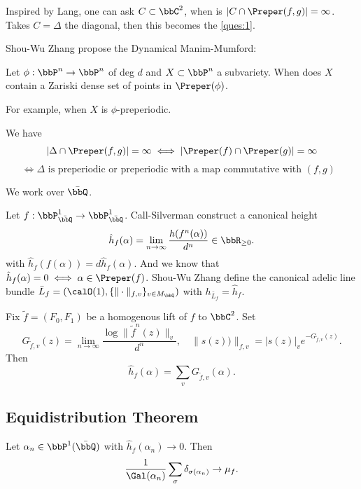 Inspired by Lang, one can ask $C \subset \bbC^2$, when is $|C \cap \Preper(f,g)| = \infty$.
Takes $C = \Delta$ the diagonal, then this becomes the \cref{ques:1}.

Shou-Wu Zhang propose the Dynamical Manim-Mumford:
\begin{conjecture}[label=\labelNFM{conj:dmm}, status=draft, tag=0000000]
	Let $\phi: \bbP^n \to \bbP^n$ of deg $d$ and $X \subset \bbP^n$ a subvariety.
	When does $X$ contain a Zariski dense set of points in $\Preper(\phi)$.
\end{conjecture}

For example, when $X$ is $\phi$-preperiodic.

\begin{theorem}[label=\labelNFM{thm:1}, status=draft, tag=0000000]
	We have
	\[ |\Delta \cap \Preper(f,g)| = \infty \iff |\Preper(f) \cap \Preper(g)| = \infty \]
	\[\iff \Delta \text{ is preperiodic or preperiodic with a map commutative with $(f,g)$ } \]
\end{theorem}

We work over $\bar{\bbQ}$.

Let $f: \bbP^1_{\bar{\bbQ}} \to \bbP^1_{\bar{\bbQ}}$.
Call-Silverman construct a canonical height
\[ \hat{h}_f(\alpha) = \lim_{n \to \infty} \frac{h(f^n(\alpha))}{d^n} \in \bbR_{\geq 0}. \]
with $\hat{h}_f(f(\alpha)) = d\hat{h}_f(\alpha)$.
And we know that $\hat{h}_f(\alpha) = 0 \iff \alpha \in \Preper(f)$.
Shou-Wu Zhang define the canonical adelic line bundle $\bar{L}_f = (\calO(1), \{\|\cdot\|_{f,v}\}_{v \in M_\bbQ})$ with $h_{\bar{L}_f} = \hat{h}_f$.

Fix $\tilde{f} = (F_0,F_1)$ be a homogenous lift of $f$ to $\bbC^2$.
Set
\[ G_{\tilde{f},v}(z) = \lim_{n \to \infty} \frac{\log \|\tilde{f}^n(z)\|_v}{d^n}, \quad \|s(z))\|_{f,v} = |s(z)|_v e^{-G_{\tilde{f},v}(z)}. \]
Then
\[ \hat{h}_f(\alpha) = \sum_v G_{\tilde{f},v}(\alpha). \]


\subsection[status=draft,tag=0000000,label=\labelNFM{subsec:equidistribution}]{Equidistribution Theorem}

\begin{theorem}[label=\labelNFM{thm:ed}, status=draft, tag=0000000]
	Let $\alpha_n \in \bbP^1(\bar{\bbQ})$ with $\hat{h}_f(\alpha_n) \to 0$.
	Then
	\[ \frac{1}{\Gal(\alpha_n)} \sum_{\sigma} \delta_{\sigma(\alpha_n)} \to \mu_f. \]
\end{theorem}

